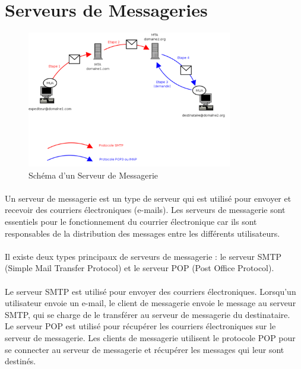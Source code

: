 \section{Serveurs de Messageries}
	\begin{figure}[h]
		\hbox{\includegraphics[width=0.8\textwidth]{PhotoMemoire/Serveur_Messagerie.png}}
\caption{Schéma d'un Serveur de Messagerie}
\end{figure}
\paragraph{ }

Un serveur de messagerie est un type de serveur qui est utilisé pour envoyer et recevoir des courriers électroniques (e-mails). Les serveurs de messagerie sont essentiels pour le fonctionnement du courrier électronique car ils sont responsables de la distribution des messages entre les différents utilisateurs.\\
\paragraph{ }
Il existe deux types principaux de serveurs de messagerie : le serveur SMTP (Simple Mail Transfer Protocol) et le serveur POP (Post Office Protocol).\\
\paragraph{ }
Le serveur SMTP est utilisé pour envoyer des courriers électroniques. Lorsqu'un utilisateur envoie un e-mail, le client de messagerie envoie le message au serveur SMTP, qui se charge de le transférer au serveur de messagerie du destinataire.\\

Le serveur POP est utilisé pour récupérer les courriers électroniques sur le serveur de messagerie. Les clients de messagerie utilisent le protocole POP pour se connecter au serveur de messagerie et récupérer les messages qui leur sont destinés.

